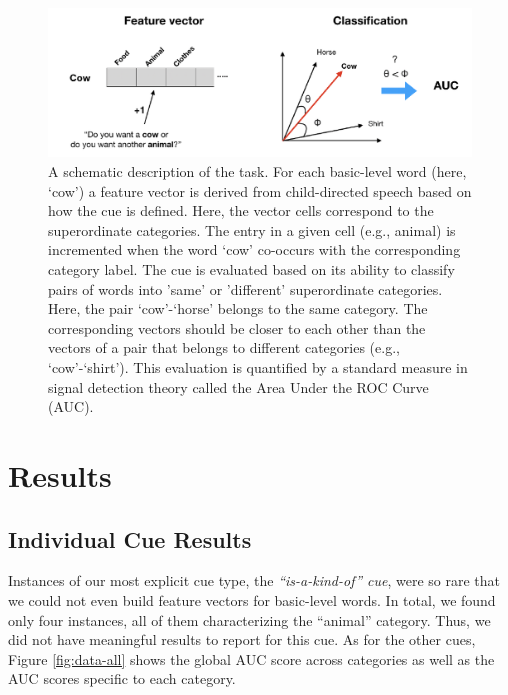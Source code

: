 \documentclass[english,,man,floatsintext]{apa6}
\begin{document}
\begin{figure}[h]

{\centering \includegraphics{cogsci_journal_files/figure-latex/task-1} 

}

\caption{\label{fig:task} A schematic description of the task. For each basic-level word (here, `cow') a feature vector is derived from child-directed speech based on how the cue is defined. Here, the vector cells correspond to the superordinate categories. The entry in a given cell (e.g., animal) is incremented when the word `cow' co-occurs with the corresponding category label. The cue is evaluated based on its ability to classify pairs of words into 'same' or 'different' superordinate categories. Here, the pair `cow'-`horse' belongs to the same category. The corresponding vectors should be closer to each other than the vectors of a pair that belongs to different categories (e.g., `cow'-`shirt'). This evaluation is quantified by a standard measure in signal detection theory called the Area Under the ROC Curve (AUC).}\label{fig:task}
\end{figure}

\hypertarget{results}{%
\section{Results}\label{results}}

\hypertarget{individual-cue-results}{%
\subsection{Individual Cue Results}\label{individual-cue-results}}

Instances of our most explicit cue type, the \emph{\enquote{is-a-kind-of} cue}, were so rare that we could not even build feature vectors for basic-level words. In total, we found only four instances, all of them characterizing the \enquote{animal} category. Thus, we did not have meaningful results to report for this cue. As for the other cues, Figure \ref{fig:data-all} shows the global AUC score across categories as well as the AUC scores specific to each category.
\end{document}
